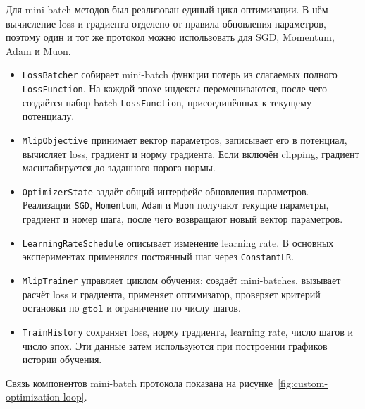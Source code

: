 Для mini-batch методов был реализован единый цикл оптимизации. В нём вычисление loss и градиента отделено от правила обновления параметров, поэтому один и тот же протокол можно использовать для SGD, Momentum, Adam и Muon.

\begin{itemize}
    \item \texttt{LossBatcher} собирает mini-batch функции потерь из слагаемых полного \texttt{LossFunction}. На каждой эпохе индексы перемешиваются, после чего создаётся набор batch-\texttt{LossFunction}, присоединённых к текущему потенциалу.
    \item \texttt{MlipObjective} принимает вектор параметров, записывает его в потенциал, вычисляет loss, градиент и норму градиента. Если включён clipping, градиент масштабируется до заданного порога нормы.
    \item \texttt{OptimizerState} задаёт общий интерфейс обновления параметров. Реализации \texttt{SGD}, \texttt{Momentum}, \texttt{Adam} и \texttt{Muon} получают текущие параметры, градиент и номер шага, после чего возвращают новый вектор параметров.
    \item \texttt{LearningRateSchedule} описывает изменение learning rate. В основных экспериментах применялся постоянный шаг через \texttt{ConstantLR}.
    \item \texttt{MlipTrainer} управляет циклом обучения: создаёт mini-batches, вызывает расчёт loss и градиента, применяет оптимизатор, проверяет критерий остановки по \(\texttt{gtol}\) и ограничение по числу шагов.
    \item \texttt{TrainHistory} сохраняет loss, норму градиента, learning rate, число шагов и число эпох. Эти данные затем используются при построении графиков истории обучения.
\end{itemize}

Связь компонентов mini-batch протокола показана на рисунке~\ref{fig:custom-optimization-loop}.

